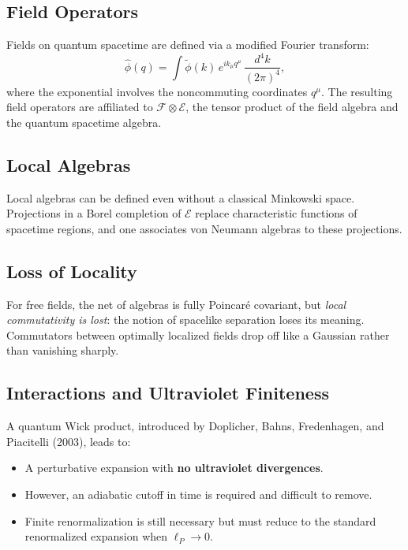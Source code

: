 \documentclass[11pt,a4paper]{article}
\begin{document}
\subsection{Field Operators}

Fields on quantum spacetime are defined via a modified Fourier transform:
\begin{equation}
  \hat{\phi}(q) = \int \tilde{\phi}(k)\, e^{ik_\mu q^\mu}\,
  \frac{d^4k}{(2\pi)^4},
\end{equation}
where the exponential involves the noncommuting coordinates $q^\mu$.
The resulting field operators are affiliated to $\mathcal{F} \otimes \mathcal{E}$,
the tensor product of the field algebra and the quantum spacetime algebra.

\subsection{Local Algebras}

Local algebras can be defined even without a classical Minkowski space.
Projections in a Borel completion of $\mathcal{E}$ replace characteristic
functions of spacetime regions, and one associates von Neumann algebras
to these projections.

\subsection{Loss of Locality}

For free fields, the net of algebras is fully Poincar\'e covariant,
but \emph{local commutativity is lost}: the notion of spacelike
separation loses its meaning. Commutators between optimally localized
fields drop off like a Gaussian rather than vanishing sharply.

\subsection{Interactions and Ultraviolet Finiteness}

A quantum Wick product, introduced by Doplicher, Bahns, Fredenhagen,
and Piacitelli (2003), leads to:
\begin{itemize}[nosep]
  \item A perturbative expansion with \textbf{no ultraviolet divergences}.
  \item However, an adiabatic cutoff in time is required and difficult to remove.
  \item Finite renormalization is still necessary but must reduce to
        the standard renormalized expansion when $\ell_P \to 0$.
\end{itemize}
\end{document}
